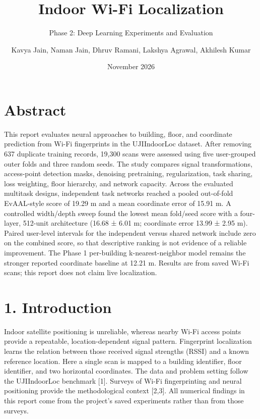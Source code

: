 \documentclass[
  10pt,
  a4paper,
]{article}
\title{Indoor Wi-Fi Localization}
\subtitle{Phase 2: Deep Learning Experiments and Evaluation}
\author{Kavya Jain, Naman Jain, Dhruv Ramani, Lakshya Agrawal, Akhilesh Kumar}
\date{November 2026}
\begin{document}
\maketitle

{
\hypersetup{linkcolor=}
\setcounter{tocdepth}{3}
\tableofcontents
}
\section{Abstract}\label{abstract}

This report evaluates neural approaches to building, floor, and
coordinate prediction from Wi-Fi fingerprints in the UJIIndoorLoc
dataset. After removing 637 duplicate training records, 19,300 scans
were assessed using five user-grouped outer folds and three random
seeds. The study compares signal transformations, access-point detection
masks, denoising pretraining, regularization, task sharing, loss
weighting, floor hierarchy, and network capacity. Across the evaluated
multitask designs, independent task networks reached a pooled
out-of-fold EvAAL-style score of 19.29 m and a mean coordinate error of
15.91 m. A controlled width/depth sweep found the lowest mean fold/seed
score with a four-layer, 512-unit architecture (16.68 ± 6.01 m;
coordinate error 13.99 ± 2.95 m). Paired user-level intervals for the
independent versus shared network include zero on the combined score, so
that descriptive ranking is not evidence of a reliable improvement. The
Phase 1 per-building k-nearest-neighbor model remains the stronger
reported coordinate baseline at 12.21 m. Results are from saved Wi-Fi
scans; this report does not claim live localization.

\section{1. Introduction}\label{introduction}

Indoor satellite positioning is unreliable, whereas nearby Wi-Fi access
points provide a repeatable, location-dependent signal pattern.
Fingerprint localization learns the relation between those received
signal strengths (RSSI) and a known reference location. Here a single
scan is mapped to a building identifier, floor identifier, and two
horizontal coordinates. The data and problem setting follow the
UJIIndoorLoc benchmark {[}1{]}. Surveys of Wi-Fi fingerprinting and
neural positioning provide the methodological context {[}2,3{]}. All
numerical findings in this report come from the project's saved
experiments rather than from those surveys.
\end{document}
